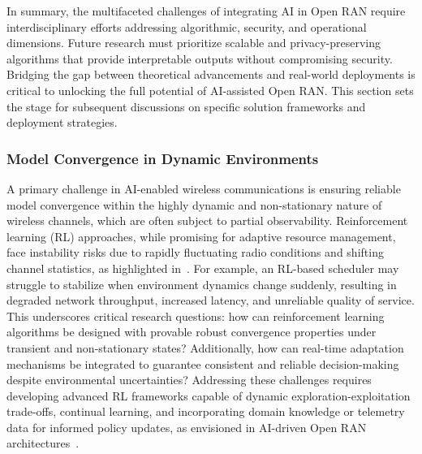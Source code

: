 \documentclass[sigconf]{acmart}
\begin{document}
In summary, the multifaceted challenges of integrating AI in Open RAN require interdisciplinary efforts addressing algorithmic, security, and operational dimensions. Future research must prioritize scalable and privacy-preserving algorithms that provide interpretable outputs without compromising security. Bridging the gap between theoretical advancements and real-world deployments is critical to unlocking the full potential of AI-assisted Open RAN. This section sets the stage for subsequent discussions on specific solution frameworks and deployment strategies.

\subsubsection{Model Convergence in Dynamic Environments}
A primary challenge in AI-enabled wireless communications is ensuring reliable model convergence within the highly dynamic and non-stationary nature of wireless channels, which are often subject to partial observability. Reinforcement learning (RL) approaches, while promising for adaptive resource management, face instability risks due to rapidly fluctuating radio conditions and shifting channel statistics, as highlighted in~\cite{ref54}. For example, an RL-based scheduler may struggle to stabilize when environment dynamics change suddenly, resulting in degraded network throughput, increased latency, and unreliable quality of service. This underscores critical research questions: how can reinforcement learning algorithms be designed with provable robust convergence properties under transient and non-stationary states? Additionally, how can real-time adaptation mechanisms be integrated to guarantee consistent and reliable decision-making despite environmental uncertainties? Addressing these challenges requires developing advanced RL frameworks capable of dynamic exploration-exploitation trade-offs, continual learning, and incorporating domain knowledge or telemetry data for informed policy updates, as envisioned in AI-driven Open RAN architectures~\cite{ref54}.
\end{document}
